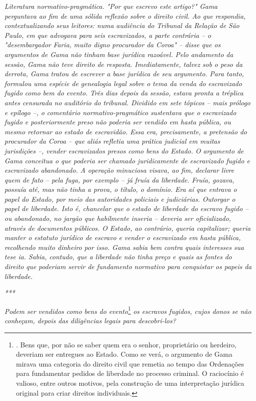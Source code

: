 \emph{Literatura normativo-pragmática. "Por que escrevo este artigo?"
Gama perguntava ao fim de uma sólida reflexão sobre o direito civil. Ao
que respondia, contextualizando seus leitores: numa audiência do
Tribunal da Relação de São Paulo, em que advogava para seis
escravizados, a parte contrária -- o "desembargador Faria, muito digno
procurador da Coroa" -- disse que os argumentos de Gama não tinham base
jurídica razoável. Pelo andamento da sessão, Gama não teve direito de
resposta. Imediatamente, talvez sob o peso da derrota, Gama tratou de
escrever a base jurídica de seu argumento. Para tanto, formulou uma
espécie de genealogia legal sobre o tema da venda do escravizado fugido
como bem do evento. Três dias depois da sessão, estava pronta a tréplica
antes censurada no auditório do tribunal. Dividido em sete tópicos --
mais prólogo e epílogo --, o comentário normativo-pragmático sustentava
que o escravizado fugido e posteriormente preso não poderia ser vendido
em hasta pública, ou mesmo retornar ao estado de escravidão. Essa era,
precisamente, a pretensão do procurador da Coroa -- que aliás refletia
uma prática judicial em muitas jurisdições --, vender escravizados
presos como bens do Estado. O argumento de Gama conceitua o que poderia
ser chamado juridicamente de escravizado fugido e escravizado
abandonado. A operação minuciosa visava, ao fim, declarar livre quem de
fato -- pela fuga, por exemplo -- já fruía da liberdade. Fruía, gozava,
possuía até, mas não tinha a prova, o título, o domínio. Era aí que
entrava o papel do Estado, por meio das autoridades policiais e
judiciárias. Outorgar o papel de liberdade. Isto é, chancelar que o
estado de liberdade do escravo fugido -- ou abandonado, no jargão que
habilmente inseria -- deveria ser oficializado, através de documentos
públicos. O Estado, ao contrário, queria capitalizar; queria manter o
estatuto jurídico de escravo e vender o escravizado em hasta pública,
recolhendo muito dinheiro por isso. Gama sabia bem contra quais
interesses sua tese ia. Sabia, contudo, que a liberdade não tinha preço
e quais as fontes do direito que poderiam servir de fundamento normativo
para conquistar os papeis da liberdade.}

\emph{***}

\emph{Podem ser vendidos como bens do evento}\footnote{. Bens que, por
  não se saber quem era o senhor, proprietário ou herdeiro, deveriam ser
  entregues ao Estado. Como se verá, o argumento de Gama mirava uma
  categoria do direito civil que remetia ao tempo das Ordenações para
  fundamentar pedidos de liberdade no processo criminal. O raciocínio é
  valioso, entre outros motivos, pela construção de uma interpretação
  jurídica original para criar direitos individuais.} \emph{os escravos
fugidos, cujos donos se não conheçam, depois das diligências legais para
descobri-los?}

